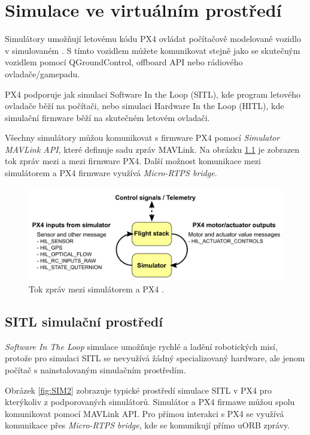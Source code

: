 \chapter{Simulace ve virtuálním prostředí}

Simulátory umožňují letovému kódu PX4 ovládat počítačově modelované vozidlo v simulovaném . S tímto vozidlem můžete komunikovat stejně jako se skutečným vozidlem pomocí QGroundControl, offboard API nebo rádiového ovladače/gamepadu. 

PX4 podporuje jak simulaci Software In the Loop (SITL), kde program letového ovladače běží na počítači, nebo simulaci Hardware In the Loop (HITL), kde simulační firmware běží na skutečném letovém ovladači. \cite{SIM}

Všechny simulátory můžou komunikovat s firmware PX4 pomocí \textit{Simulator MAVLink API}, které definuje sadu zpráv MAVLink. Na obrázku \ref{fig:SIM1} je zobrazen tok zpráv mezi  a mezi firmware PX4. Další možnost komunikace mezi simulátorem a PX4 firmware využívá \textit{Micro-RTPS bridge}.

\begin{figure}[!ht]
  \begin{center}
    \includegraphics[scale=0.31]{obrazky/SIM1}
  \end{center}
  \caption[Tok zpráv mezi simulátorem a PX4]{Tok zpráv mezi simulátorem a PX4 \cite{SIM}.}
  \label{fig:SIM1}
\end{figure}

\section{SITL simulační prostředí}

\textit{Software In The Loop} simulace umožňuje rychlé a  ladění robotických misí, protože pro simulaci SITL se nevyužívá žádný specializovaný hardware, ale jenom počítač s nainstalovaným simulačním prostředím.

Obrázek \ref{fig:SIM2} zobrazuje typické prostředí simulace SITL v PX4 pro kterýkoliv z podporovaných simulátorů. Simulátor a PX4 firmawe můžou spolu komunikovat pomocí MAVLink \acs{API}. Pro přímou interakci s PX4 se využívá komunikace přes \textit{Micro-RTPS bridge}, kde se komunikují přímo uORB zprávy.

